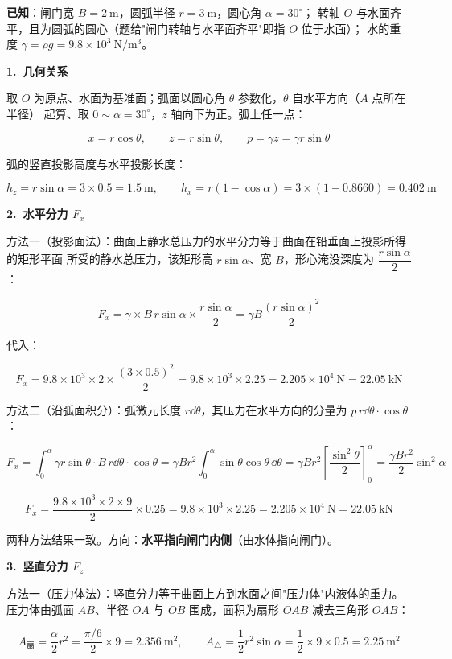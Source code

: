 \begin{jie}
\textbf{已知}：闸门宽 $B=2\ \mathrm{m}$，圆弧半径 $r=3\ \mathrm{m}$，圆心角 $\alpha=30^{\circ}$；
转轴 $O$ 与水面齐平，且为圆弧的圆心（题给"闸门转轴与水平面齐平"即指 $O$ 位于水面）；
水的重度 $\gamma=\rho g=9.8\times10^{3}\ \mathrm{N/m^3}$。

\textbf{1.\ 几何关系}

取 $O$ 为原点、水面为基准面；弧面以圆心角 $\theta$ 参数化，$\theta$ 自水平方向（$A$ 点所在半径）
起算、取 $0\sim\alpha=30^{\circ}$，$z$ 轴向下为正。弧上任一点：

\[ x=r\cos\theta,\qquad z=r\sin\theta,\qquad p=\gamma z=\gamma r\sin\theta \]

弧的竖直投影高度与水平投影长度：

\[ h_z=r\sin\alpha=3\times0.5=1.5\ \mathrm{m},\qquad
h_x=r(1-\cos\alpha)=3\times(1-0.8660)=0.402\ \mathrm{m} \]

\textbf{2.\ 水平分力 $F_x$}

方法一（投影面法）：曲面上静水总压力的水平分力等于曲面在铅垂面上投影所得的矩形平面
所受的静水总压力，该矩形高 $r\sin\alpha$、宽 $B$，形心淹没深度为 $\dfrac{r\sin\alpha}{2}$：

\[ F_x=\gamma\times B\,r\sin\alpha\times\frac{r\sin\alpha}{2}
=\gamma B\frac{(r\sin\alpha)^2}{2} \]

代入：

\[ F_x=9.8\times10^{3}\times2\times\frac{(3\times0.5)^2}{2}
=9.8\times10^{3}\times2.25=2.205\times10^{4}\ \mathrm{N}=22.05\ \mathrm{kN} \]

方法二（沿弧面积分）：弧微元长度 $r\dd\theta$，其压力在水平方向的分量为
$p\,r\dd\theta\cdot\cos\theta$：

\[ F_x=\int_0^{\alpha}\gamma r\sin\theta\cdot B\,r\dd\theta\cdot\cos\theta
=\gamma Br^2\int_0^{\alpha}\sin\theta\cos\theta\,\dd\theta
=\gamma Br^2\left[\frac{\sin^2\theta}{2}\right]_0^{\alpha}
=\frac{\gamma Br^2}{2}\sin^2\alpha \]

\[ F_x=\frac{9.8\times10^{3}\times2\times9}{2}\times0.25=9.8\times10^{3}\times2.25
=2.205\times10^{4}\ \mathrm{N}=22.05\ \mathrm{kN} \]

两种方法结果一致。方向：\textbf{水平指向闸门内侧}（由水体指向闸门）。

\textbf{3.\ 竖直分力 $F_z$}

方法一（压力体法）：竖直分力等于曲面上方到水面之间"压力体"内液体的重力。
压力体由弧面 $AB$、半径 $OA$ 与 $OB$ 围成，面积为扇形 $OAB$ 减去三角形 $OAB$：

\[ A_{\text{扇}}=\frac{\alpha}{2}r^2=\frac{\pi/6}{2}\times9=2.356\ \mathrm{m^2},\qquad
A_{\triangle}=\frac{1}{2}r^2\sin\alpha=\frac{1}{2}\times9\times0.5=2.25\ \mathrm{m^2} \]


\end{jie}
